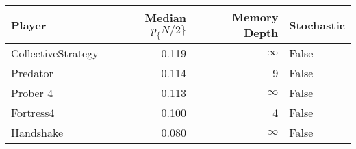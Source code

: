 \begin{tabular}{lrrl}
\toprule
             Player &  Median $p_\{N/2\}$ &  Memory Depth & Stochastic \\
\midrule
 CollectiveStrategy &             0.119 &            \(\infty\) &      False \\
           Predator &             0.114 &             9 &      False \\
           Prober 4 &             0.113 &            \(\infty\) &      False \\
          Fortress4 &             0.100 &             4 &      False \\
          Handshake &             0.080 &            \(\infty\) &      False \\
\bottomrule
\end{tabular}
